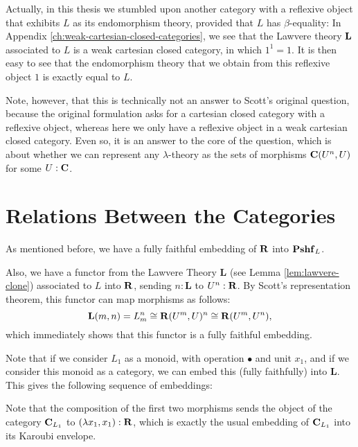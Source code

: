 \begin{remark}
  Actually, in this thesis we stumbled upon another category with a reflexive object that exhibits $ L $ as its endomorphism theory, provided that $ L $ has $ \beta $-equality: In Appendix \ref{ch:weak-cartesian-closed-categories}, we see that the Lawvere theory $ \mathbf{L} $ associated to $ L $ is a weak cartesian closed category, in which $ 1^1 = 1 $. It is then easy to see that the endomorphism theory that we obtain from this reflexive object $ 1 $ is exactly equal to $ L $.

  Note, however, that this is technically not an answer to Scott's original question, because the original formulation asks for a cartesian closed category with a reflexive object, whereas here we only have a reflexive object in a weak cartesian closed category. Even so, it is an answer to the core of the question, which is about whether we can represent any $ \lambda $-theory as the sets of morphisms $ \mathbf{C}(U^n, U) $ for some $ U : \mathbf{C} $.
\end{remark}

\section{Relations Between the Categories}\label{sec:hyland-categories}

As mentioned before, we have a fully faithful embedding of $ \mathbf{R} $ into $ \mathbf{Pshf}_{L} $.

Also, we have a functor from the Lawvere Theory $ \mathbf{L} $ (see Lemma \ref{lem:lawvere-clone}) associated to $ L $ into $ \mathbf{R} $, sending $ n : \mathbf L $ to $ U^n : \mathbf{R} $. By Scott's representation theorem, this functor can map morphisms as follows:
\[ \mathbf L(m, n) = L_m^n \cong \mathbf{R}(U^m, U)^n \cong \mathbf{R}(U^m, U^n), \]
which immediately shows that this functor is a fully faithful embedding.

Note that if we consider $ L_1 $ as a monoid, with operation $ \bullet $ and unit $ x_1 $, and if we consider this monoid as a category, we can embed this (fully faithfully) into $ \mathbf L $. This gives the following sequence of embeddings:
\begin{center}
\end{center}

Note that the composition of the first two morphisms sends the object of the category $ \mathbf{C}_{L_1} $ to $ (\lambda x_1, x_1) : \mathbf{R} $, which is exactly the usual embedding of $ \mathbf{C}_{L_1} $ into its Karoubi envelope.

